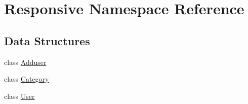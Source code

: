 \hypertarget{namespace_responsive}{}\section{Responsive Namespace Reference}
\label{namespace_responsive}
\subsection*{Data Structures}
\begin{DoxyCompactItemize}
\item 
class \mbox{\hyperlink{class_responsive_1_1_adduser}{Adduser}}
\item 
class \mbox{\hyperlink{class_responsive_1_1_category}{Category}}
\item 
class \mbox{\hyperlink{class_responsive_1_1_user}{User}}
\end{DoxyCompactItemize}
